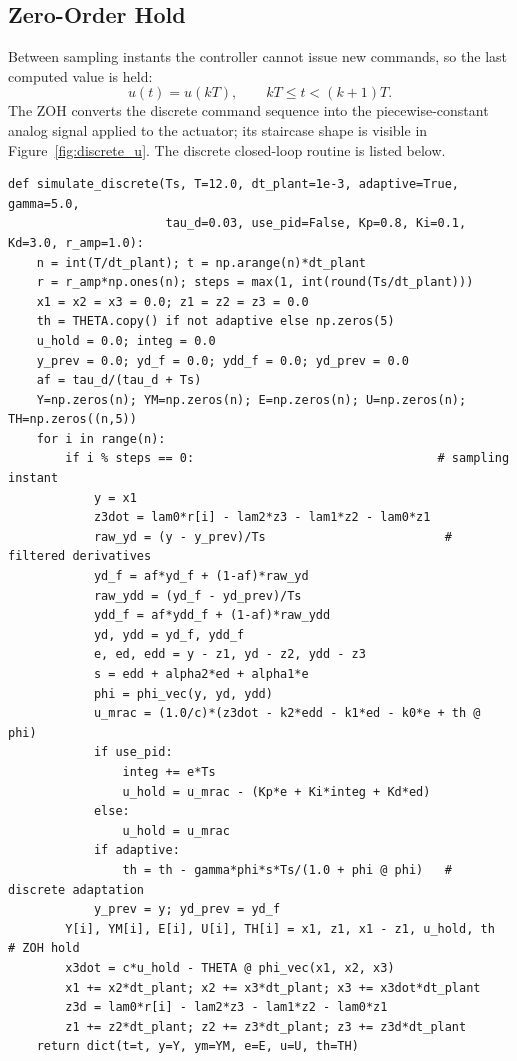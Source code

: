 \documentclass[12pt]{article}
\begin{document}
\subsection{Zero-Order Hold}

\noindent Between sampling instants the controller cannot issue new commands, so the last computed value is held:
\[
u(t) = u(kT),\qquad kT \leq t < (k+1)T.
\]
\noindent The ZOH converts the discrete command sequence into the piecewise-constant analog signal applied to the actuator; its staircase shape is visible in Figure~\ref{fig:discrete_u}. The discrete closed-loop routine is listed below.

\begin{lstlisting}[caption={Discrete-time controller with ZOH (indirect digital design).}, label={lst:disc}]
def simulate_discrete(Ts, T=12.0, dt_plant=1e-3, adaptive=True, gamma=5.0,
                      tau_d=0.03, use_pid=False, Kp=0.8, Ki=0.1, Kd=3.0, r_amp=1.0):
    n = int(T/dt_plant); t = np.arange(n)*dt_plant
    r = r_amp*np.ones(n); steps = max(1, int(round(Ts/dt_plant)))
    x1 = x2 = x3 = 0.0; z1 = z2 = z3 = 0.0
    th = THETA.copy() if not adaptive else np.zeros(5)
    u_hold = 0.0; integ = 0.0
    y_prev = 0.0; yd_f = 0.0; ydd_f = 0.0; yd_prev = 0.0
    af = tau_d/(tau_d + Ts)
    Y=np.zeros(n); YM=np.zeros(n); E=np.zeros(n); U=np.zeros(n); TH=np.zeros((n,5))
    for i in range(n):
        if i % steps == 0:                                  # sampling instant
            y = x1
            z3dot = lam0*r[i] - lam2*z3 - lam1*z2 - lam0*z1
            raw_yd = (y - y_prev)/Ts                         # filtered derivatives
            yd_f = af*yd_f + (1-af)*raw_yd
            raw_ydd = (yd_f - yd_prev)/Ts
            ydd_f = af*ydd_f + (1-af)*raw_ydd
            yd, ydd = yd_f, ydd_f
            e, ed, edd = y - z1, yd - z2, ydd - z3
            s = edd + alpha2*ed + alpha1*e
            phi = phi_vec(y, yd, ydd)
            u_mrac = (1.0/c)*(z3dot - k2*edd - k1*ed - k0*e + th @ phi)
            if use_pid:
                integ += e*Ts
                u_hold = u_mrac - (Kp*e + Ki*integ + Kd*ed)
            else:
                u_hold = u_mrac
            if adaptive:
                th = th - gamma*phi*s*Ts/(1.0 + phi @ phi)   # discrete adaptation
            y_prev = y; yd_prev = yd_f
        Y[i], YM[i], E[i], U[i], TH[i] = x1, z1, x1 - z1, u_hold, th   # ZOH hold
        x3dot = c*u_hold - THETA @ phi_vec(x1, x2, x3)
        x1 += x2*dt_plant; x2 += x3*dt_plant; x3 += x3dot*dt_plant
        z3d = lam0*r[i] - lam2*z3 - lam1*z2 - lam0*z1
        z1 += z2*dt_plant; z2 += z3*dt_plant; z3 += z3d*dt_plant
    return dict(t=t, y=Y, ym=YM, e=E, u=U, th=TH)
\end{lstlisting}
\end{document}
